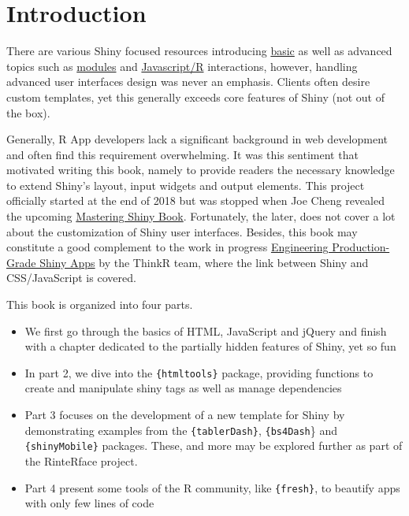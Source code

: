 \documentclass[]{book}
\providecommand{\tightlist}{%
  \setlength{\itemsep}{0pt}\setlength{\parskip}{0pt}}
\begin{document}
\hypertarget{intro}{%
\chapter{Introduction}\label{intro}}

There are various Shiny focused resources introducing \href{https://shiny.rstudio.com/tutorial/}{basic} as well as advanced topics such as \href{https://shiny.rstudio.com/articles/\#modules}{modules} and \href{https://js4shiny.com}{Javascript/R} interactions, however, handling advanced user interfaces design was never an emphasis. Clients often desire custom templates, yet this generally exceeds core features of Shiny (not out of the box).

Generally, R App developers lack a significant background in web development and often find this requirement overwhelming. It was this sentiment that motivated writing this book, namely to provide readers the necessary knowledge to extend Shiny's layout, input widgets and output elements. This project officially started at the end of 2018 but was stopped when Joe Cheng revealed the upcoming \href{https://mastering-shiny.org}{Mastering Shiny Book}. Fortunately, the later, does not cover a lot about the customization of Shiny user interfaces. Besides, this book may constitute a good complement to the work in progress \href{https://engineering-shiny.org}{Engineering Production-Grade Shiny Apps} by the ThinkR team, where the link between Shiny and CSS/JavaScript is covered.

This book is organized into four parts.

\begin{itemize}
\tightlist
\item
  We first go through the basics of HTML, JavaScript and jQuery and finish with a chapter dedicated to the partially hidden features of Shiny, yet so fun
\item
  In part 2, we dive into the \texttt{\{htmltools\}} package, providing functions to create and manipulate shiny tags as well as manage dependencies
\item
  Part 3 focuses on the development of a new template for Shiny by demonstrating examples from the \texttt{\{tablerDash\}}, \texttt{\{bs4Dash}\} and \texttt{\{shinyMobile\}} packages. These, and more may be explored further as part of the RinteRface project.
\item
  Part 4 present some tools of the R community, like \texttt{\{fresh\}}, to beautify apps with only few lines of code
\end{itemize}
\end{document}
